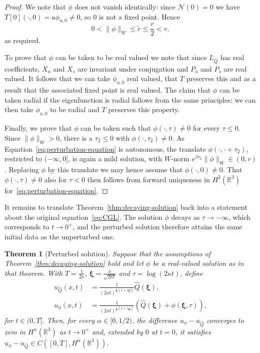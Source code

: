 \documentclass[11pt]{article}
\newtheorem{theorem}[definition]{Theorem}
\begin{document}
\begin{proof}
  We note that \(\phi\) does not vanish identically: since
  \(\mathcal{N}(0) = 0\) we have
  \(T[0](\cdot, 0) = a\phi_{u,0} \neq 0\), so \(0\) is not a fixed
  point. Hence
  \begin{equation*}
    0 < \|\phi\|_{W} \leq \tilde{r} \leq \frac{r}{2} < r,
  \end{equation*}
  as required.

  To prove that \(\phi\) can be taken to be real valued we note that
  since \(L_{\hat{Q}}\) has real coefficients, \(X_{u}\) and \(X_{s}\)
  are invariant under conjugation and \(P_{u}\) and \(P_{s}\) are real
  valued. It follows that we can take \(\phi_{u,0}\) real valued, that
  \(T\) preserves this and as a result that the associated fixed point
  is real valued. The claim that \(\phi\) can be taken radial if the
  eigenfunction is radial follows from the same principles: we can
  then take \(\phi_{u,0}\) to be radial and \(T\) preserves this
  property.

  Finally, we prove that \(\phi\) can be taken such that
  \(\phi(\cdot, \tau) \neq 0\) for every \(\tau \leq 0\). Since
  \(\|\phi\|_{W} > 0\), there is a \(\tau_{2} \leq 0\) with
  \(\phi(\cdot, \tau_{2}) \neq 0\). As
  Equation~\eqref{eq:perturbation-equation} is autonomous, the
  translate \(\phi(\cdot, \cdot + \tau_{2})\), restricted to
  \((-\infty, 0]\), is again a mild solution, with \(W\)-norm
  \(e^{\beta\tau_{2}}\|\phi\|_{W} \in (0, r)\). Replacing \(\phi\) by
  this translate we may hence assume that
  \(\phi(\cdot, 0) \neq 0\). That \(\phi(\cdot, \tau) \neq 0\) also
  for \(\tau < 0\) then follows from forward uniqueness in
  \(H^{2}(\mathbb{R}^{3})\) for~\eqref{eq:perturbation-equation}.
\end{proof}

It remains to translate Theorem~\ref{thm:decaying-solution} back into
a statement about the original equation~\eqref{eq:CGL}. The solution
\(\phi\) decays as \(\tau \to -\infty\), which corresponds to
\(t \to 0^{+}\), and the perturbed solution therefore attains the same
initial data as the unperturbed one.

\begin{theorem}[Perturbed solution]\label{thm:perturbed-solution}
  Suppose that the assumptions of Theorem~\ref{thm:decaying-solution}
  hold and let \(\phi\) be a real-valued solution as in that theorem.
  With
  \(T = \frac{1}{2\kappa}\), \(\bm{\xi} = \frac{x}{\sqrt{2\kappa t}}\)
  and \(\tau = \log(2\kappa t)\), define
  \begin{align*}
    u_{\hat{Q}}(x, t) &= \frac{1}{(2\kappa t)^{\frac{1}{2}\left(1 + i\frac{\omega}{\kappa}\right)}}\hat{Q}(\bm{\xi}),\\
    u_{\phi}(x, t) &= \frac{1}{(2\kappa t)^{\frac{1}{2}\left(1 + i\frac{\omega}{\kappa}\right)}}\left(\hat{Q}(\bm{\xi}) + \phi(\bm{\xi}, \tau)\right),
  \end{align*}
  for \(t \in (0, T]\). Then, for every \(\alpha \in [0, 1 / 2)\), the
  difference \(u_{\phi} - u_{\hat{Q}}\) converges to zero in
  \(H^{\alpha}(\mathbb{R}^{3})\) as \(t \to 0^{+}\) and, extended by
  \(0\) at \(t = 0\), it satisfies
  \(u_{\phi} - u_{\hat{Q}} \in C([0, T], H^{\alpha}(\mathbb{R}^{3}))\).
\end{theorem}
\end{document}

